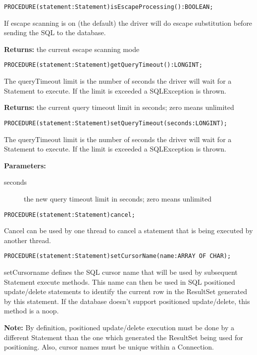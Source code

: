 
\verb'PROCEDURE(statement:Statement)isEscapeProcessing():BOOLEAN;'

     If escape scanning is on (the default) the driver will do escape substitution before sending the SQL to the database. 

     {\bf Returns: } 
          the current escape scanning mode 


\verb'PROCEDURE(statement:Statement)getQueryTimeout():LONGINT;'

     The queryTimeout limit is the number of seconds the driver will wait for a Statement to execute. If the limit is exceeded a
     SQLException is thrown. 

     {\bf Returns: } 
          the current query timeout limit in seconds; zero means unlimited 


\verb'PROCEDURE(statement:Statement)setQueryTimeout(seconds:LONGINT);'

     The queryTimeout limit is the number of seconds the driver will wait for a Statement to execute. If the limit is exceeded a
     SQLException is thrown. 

     {\bf Parameters: } 
\begin{description}
\item[seconds] the new query timeout limit in seconds; zero means unlimited 
\end{description}


\verb'PROCEDURE(statement:Statement)cancel;'

     Cancel can be used by one thread to cancel a statement that is being executed by another thread. 


\verb'PROCEDURE(statement:Statement)setCursorName(name:ARRAY OF CHAR);'

     setCursorname defines the SQL cursor name that will be used by subsequent Statement execute methods. This name can then be
     used in SQL positioned update/delete statements to identify the current row in the ResultSet generated by this statement. If the
     database doesn't support positioned update/delete, this method is a noop. 

     {\bf Note: } By definition, positioned update/delete execution must be done by a different Statement than the one which generated the
     ResultSet being used for positioning. Also, cursor names must be unique within a Connection. 

